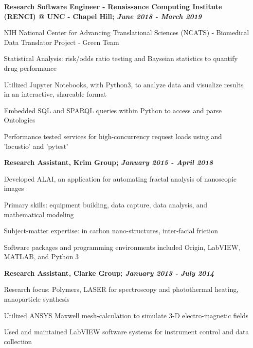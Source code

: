 \documentclass[letterpaper,final]{memoir}
\newcommand{\Sep}{\vspace{1.0em}}
\newcommand{\SmallSep}{\vspace{0.4em}}
\newcommand{\CVItem}[1]
	{\textbf{\color{Blue} #1}}
\begin{document}
\Sep

\CVItem{Research Software Engineer - Renaissance Computing Institute (RENCI) @ UNC - Chapel Hill; \textit{June 2018 - March 2019}}
\begin{compactitem}[\color{Blue}$\circ$]
    \SmallSep
    \item NIH National Center for Advancing Translational Sciences (NCATS) - Biomedical Data Translator Project - Green Team
    \SmallSep
    \item Statistical Analysis: risk/odds ratio testing and Bayseian statistics to quantify drug performance
    \SmallSep
    \item Utilized Jupyter Notebooks, with Python3, to analyze data and visualize results in an interactive, shareable format
    \SmallSep
    \item Embedded SQL and SPARQL queries within Python to access and parse Ontologies
    \SmallSep
    \item Performance tested services for high-concurrency request loads using and 'locustio' and 'pytest'


\end{compactitem}

\Sep

\CVItem{Research Assistant, Krim Group; \textit{January 2015 - April 2018}}
\begin{compactitem}[\color{Blue}$\circ$]

    \SmallSep

    \item Developed ALAI, an application for automating fractal analysis of nanoscopic images
    \item Primary skills: equipment building, data capture, data analysis, and mathematical modeling
    \item Subject-matter expertise: in carbon nano-structures, inter-facial friction
    \item Software packages and programming environments included Origin, LabVIEW, MATLAB, and Python 3

\end{compactitem}
\Sep

\CVItem{Research Assistant, Clarke Group; \textit{January 2013 - July 2014}}
\begin{compactitem}[\color{Blue}$\circ$]

    \SmallSep

    \item Research focus: Polymers, LASER for spectroscopy and photothermal heating, nanoparticle synthesis
    \item Utilized ANSYS Maxwell mesh-calculation to simulate 3-D electro-magnetic fields
    \item Used and maintained LabVIEW software systems for instrument control and data collection
\end{compactitem}
\end{document}
